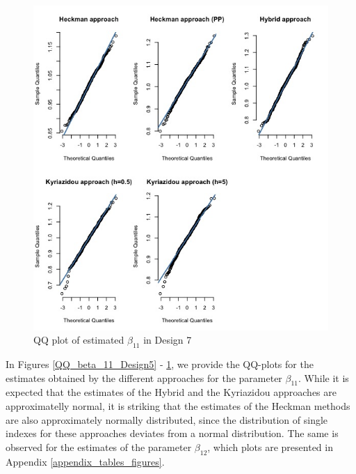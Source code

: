 \begin{figure}[htbp]
  \vspace{-2.5em}%
  \begin{adjustwidth}{-.5in}{-.5in}
  \centerline{\includegraphics[scale=.4]{content/Figures/QQ_beta_11_Design7.png}}
  \caption{\footnotesize{QQ plot of estimated $\beta_{11}$ in Design 7}}
  \label{QQ_beta_11_Design7}
  \end{adjustwidth}
\end{figure}

In Figures \ref{QQ_beta_11_Design5} - \ref{QQ_beta_11_Design7}, we provide the QQ-plots for the estimates obtained by the different approaches for the parameter $\beta_{11}$. While it is expected that the estimates of the Hybrid and the Kyriazidou approaches are approximatelly normal, it is striking that the estimates of the Heckman methods are also approximately normally distributed, since the distribution of single indexes for these approaches deviates from a normal distribution. The same is observed for the estimates of the parameter $\beta_{12}$, which plots are presented in Appendix \ref{appendix_tables_figures}.

